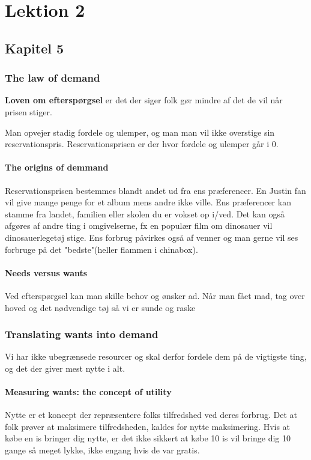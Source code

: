 \chapter{Lektion 2}
\section{Kapitel 5}
\subsection{The law of demand}
\textbf{Loven om efterspørgsel} er det der siger folk gør mindre af det de vil når prisen stiger. 

Man opvejer stadig fordele og ulemper, og man man vil ikke overstige sin reservationspris. Reservationsprisen er der hvor fordele og ulemper går i 0. 

\subsubsection{The origins of demmand}
Reservationsprisen bestemmes blandt andet ud fra ens præferencer. En Justin fan vil give mange penge for et album mens andre ikke ville. Ens præferencer kan stamme fra landet, familien eller skolen du er vokset op i/ved. Det kan også afgøres af andre ting i omgivelserne, fx en populær film om dinosauer vil dinosauerlegetøj stige. Ens forbrug påvirkes også af venner og man gerne vil ses forbruge på det "bedste"(heller flammen i chinabox).

\subsubsection{Needs versus wants}
Ved efterspørgsel kan man skille behov og ønsker ad. Når man fået mad, tag over hoved og det nødvendige tøj så vi er sunde og raske 

\subsection{Translating wants into demand}
Vi har ikke ubegrænsede resourcer og skal derfor fordele dem på de vigtigste ting, og det der giver mest nytte i alt. 

\subsubsection{Measuring wants: the concept of utility}
Nytte er et koncept der repræsentere folks tilfredshed ved deres forbrug. Det at folk prøver at maksimere tilfredsheden, kaldes for nytte maksimering. Hvis at købe en is bringer dig nytte, er det ikke sikkert at købe 10 is vil bringe dig 10 gange så meget lykke, ikke engang hvis de var gratis. 
%

